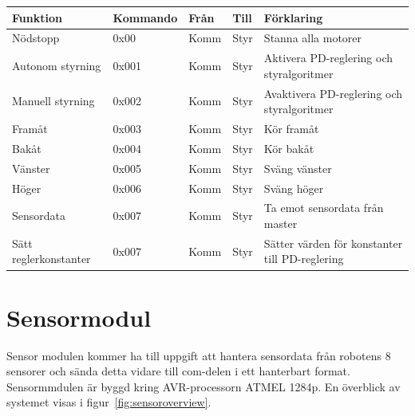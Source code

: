 \documentclass[a4paper,12pt,fleqn]{article}
\begin{document}
\begin{tabular}{| p{} | p{} | p{} | p{} | p{} |}
	\hline
	\rowcolor{listinggray}
	\textbf{Funktion} & \textbf{Kommando} & \textbf{Från} & \textbf{Till} & \textbf{Förklaring} \\ \hline
	Nödstopp & 0x00 & Komm & Styr & Stanna alla motorer \\ \hline
	Autonom styrning & 0x001 & Komm & Styr & Aktivera PD-reglering och styralgoritmer \\ \hline
	Manuell styrning & 0x002 & Komm & Styr & Avaktivera PD-reglering och styralgoritmer \\ \hline
	Framåt & 0x003 & Komm & Styr & Kör framåt \\ \hline
	Bakåt & 0x004 & Komm & Styr & Kör bakåt \\ \hline
	Vänster & 0x005 & Komm & Styr & Sväng vänster \\ \hline
	Höger & 0x006 & Komm & Styr & Sväng höger \\ \hline
	Sensordata & 0x007 & Komm & Styr & Ta emot sensordata från master \\ \hline
	Sätt reglerkonstanter & 0x007 & Komm & Styr & Sätter värden för konstanter till PD-reglering \\ \hline
\end{tabular}

\newpage



\section{Sensormodul}
Sensor modulen kommer ha till uppgift att hantera sensordata från robotens 8 sensorer och sända detta vidare till com-delen i ett hanterbart format. Sensormmdulen är byggd kring AVR-processorn ATMEL 1284p. En överblick av systemet visas i figur~\ref{fig:sensoroverview}.
\end{document}
